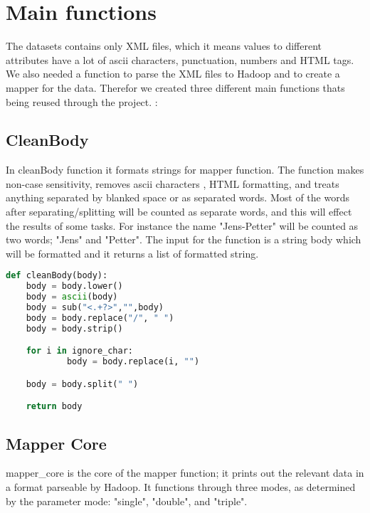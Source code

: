 \documentclass[fleqn,10pt]{wlscirep}
\begin{document}
%
%
%

\section{Main functions}
The datasets contains only XML files, which it means values to different attributes have a lot of  ascii characters, punctuation, numbers and HTML tags. We also needed a function to parse the XML files to Hadoop and to create a mapper for the data.  Therefor we created three different main functions thats being reused through the project. : 
\subsection{CleanBody}

In cleanBody function it formats strings for mapper function. The function makes non-case sensitivity, removes ascii characters , HTML formatting, and treats anything separated by blanked space or as separated words. Most of the words after separating/splitting will be counted as separate words, and this will effect the results of some tasks. For instance  the name "Jens-Petter" will be counted as two words; "Jens" and "Petter". The input for the function is a string body which will be formatted and it returns a list of formatted string.

\begin{lstlisting}[language=Python, caption=cleanBody function]
def cleanBody(body):
    body = body.lower()
    body = ascii(body)
    body = sub("<.+?>","",body)
    body = body.replace("/", " ")
    body = body.strip()

    for i in ignore_char:
        	body = body.replace(i, "")

    body = body.split(" ")

    return body
\end{lstlisting}
\subsection{Mapper Core}
mapper\_core is the core of the mapper function; it prints out the relevant data in a format parseable by Hadoop. It functions through three modes, as determined by the parameter mode: "single", "double", and "triple".
\end{document}
